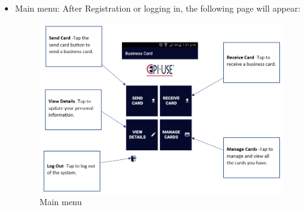 \documentclass[english]{article}
\begin{document}
	\begin{itemize}
		\item Main menu:
		\subitem After Registration or logging in, the following page will appear:
		
		\begin{figure}[H]
			\centering
			\includegraphics[scale=0.7]{Main_Menu.png}
			\caption{Main menu}
			\label{figure: 4}
		\end{figure}
	\end{itemize}
\end{document}
